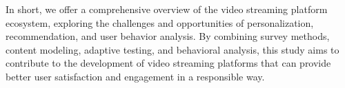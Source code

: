 In short, we offer a comprehensive overview of the video streaming platform ecosystem, exploring the challenges and opportunities of personalization, recommendation, and user behavior analysis. By combining survey methods, content modeling, adaptive testing, and behavioral analysis, this study aims to contribute to the development of video streaming platforms that can provide better user satisfaction and engagement in a responsible way.








